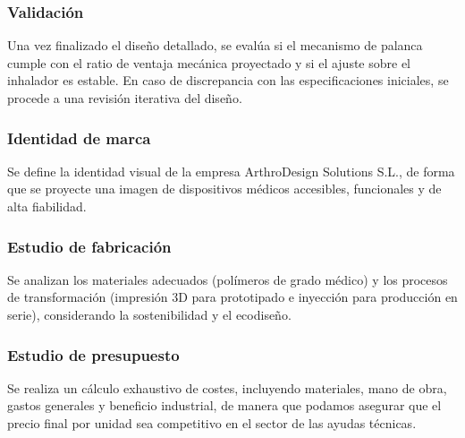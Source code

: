 \documentclass[11pt,a4paper]{article}
\begin{document}
\subsubsection{Validación}
Una vez finalizado el diseño detallado, se evalúa si el mecanismo de palanca cumple con el ratio de ventaja mecánica proyectado y si el ajuste sobre el inhalador es estable. En caso de discrepancia con las especificaciones iniciales, se procede a una revisión iterativa del diseño.

\subsubsection{Identidad de marca}
Se define la identidad visual de la empresa ArthroDesign Solutions S.L., de forma que se proyecte una imagen de dispositivos médicos accesibles, funcionales y de alta fiabilidad.

\subsubsection{Estudio de fabricación}
Se analizan los materiales adecuados (polímeros de grado médico) y los procesos de transformación (impresión 3D para prototipado e inyección para producción en serie), considerando la sostenibilidad y el ecodiseño.

\subsubsection{Estudio de presupuesto}
Se realiza un cálculo exhaustivo de costes, incluyendo materiales, mano de obra, gastos generales y beneficio industrial, de manera que podamos asegurar que el precio final por unidad sea competitivo en el sector de las ayudas técnicas.

\vspace{1.5cm}
\end{document}
